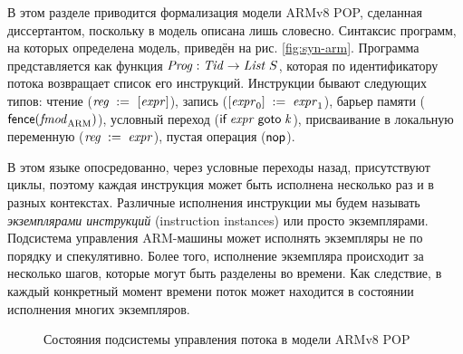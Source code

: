 В этом разделе приводится формализация модели ARMv8 POP, сделанная диссертантом,
поскольку в \cite{Flur-al:POPL16} модель описана лишь словесно.
Синтаксис программ, на которых определена модель, приведён на рис. \ref{fig:syn-arm}.
Программа представляется как функция $\mathit{Prog} : \mathit{Tid} \rightarrow \mathit{List}\;{S}$, которая по
идентификатору потока возвращает список его инструкций.
Инструкции бывают следующих типов: чтение ($\mathit{reg} \;:=_{}\;[\mathit{expr}]$), запись ($[\mathit{expr}_0]\;:=\;\mathit{expr}_1$),
барьер памяти ($\mathsf{fence}({\mathit{fmod}_{\text{ARM}}})$), условный переход ($\textsf{if} \; \mathit{expr} \; \textsf{goto} \; \mathit{k}$),
присваивание в локальную переменную ($\mathit{reg}\;:=\;\mathit{expr}$),
пустая операция ($\textsf{nop}$).

В этом языке опосредованно, через условные переходы назад, присутствуют циклы,
поэтому каждая инструкция может быть исполнена несколько раз и в разных контекстах.
Различные исполнения инструкции мы будем называть \emph{экземплярами инструкций} (instruction instances)
или просто экземплярами.
Подсистема управления ARM-машины может исполнять экземпляры не по порядку и спекулятивно.
Более того, исполнение экземпляра происходит за несколько шагов, которые могут быть разделены во времени.
Как следствие, в каждый конкретный момент времени поток может находится в состоянии исполнения многих экземпляров.

\newcommand{\tapeFont}{\small}
\begin{figure}
\begin{center}
\end{center}
\caption{Состояния подсистемы управления потока в модели ARMv8 POP}
\label{fig:armvpop:dag}
\end{figure}


